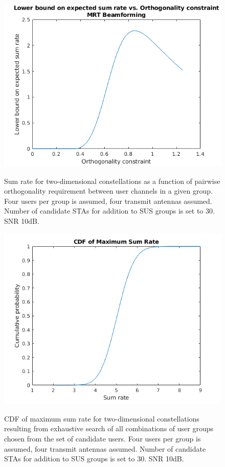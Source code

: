 \begin{figure}
    \centering
    \includegraphics[width=18cm]{figs/30_candidate_rho1_25_mrt.png}\\
    \caption{Sum rate for two-dimensional constellations as a function of pairwise orthogonality requirement between user channels in a given group. Four users per group is assumed, four transmit antennas assumed. Number of candidate STAs for addition to SUS groups is set to 30. SNR 10dB.}
    \label{fig:30_candidate}
\end{figure}

\begin{figure}
    \centering
    \includegraphics[width=18cm]{figs/cdf_4gs_30cand_1Ptx_0_1Pn.png}\\
    \caption{CDF of maximum sum rate for two-dimensional constellations resulting from exhaustive search of all combinations of user groups chosen from the set of candidate users.  Four users per group is assumed, four transmit antennas assumed. Number of candidate STAs for addition to SUS groups is set to 30. SNR 10dB.}
    \label{fig:30_candidate_cdf}
\end{figure}

